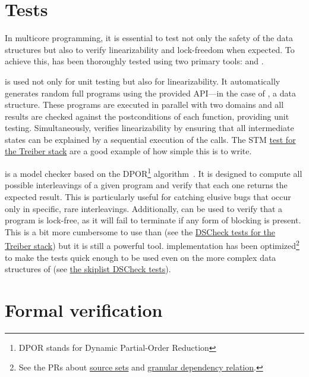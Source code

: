 \documentclass[a4paper, 11pt]{article}
\begin{document}
\section{Tests}

In multicore programming, it is essential to test not only the safety of the data structures but also to verify linearizability and lock-freedom when expected.
To achieve this, \Saturn has been thoroughly tested using two primary tools: \DSCheck and \STM.

\STM is used not only for unit testing but also for linearizability.
It automatically generates random full programs using the provided API---in the case of \Saturn, a data structure.
These programs are executed in parallel with two domains and all results are checked against the postconditions of each function, providing unit testing.
Simultaneously, \STM verifies linearizability by ensuring that all intermediate states can be explained by a sequential execution of the calls. The STM \href{https://github.com/ocaml-multicore/saturn/blob/main/test/treiber_stack/stm_treiber_stack.ml}{test for the Treiber stack} are a good example of how simple this is to write.

\DSCheck is a model checker based on the DPOR\footnote[3]{DPOR stands for Dynamic Partial-Order Reduction} algorithm~\cite{dpor05}.
It is designed to compute all possible interleavings of a given program and verify that each one returns the expected result.
This is particularly useful for catching elusive bugs that occur only in specific, rare interleavings.
Additionally, \DSCheck can be used to verify that a program is lock-free, as it will fail to terminate if any form of blocking is present. This is a bit more cumbersome to use than \STM (see the \href{https://github.com/ocaml-multicore/saturn/blob/main/test/treiber_stack/treiber_stack_dscheck.ml}{DSCheck tests for the Treiber stack}) but it is still a powerful tool. \DSCheck implementation has been optimized\footnote[4]{See the PRs about \href{https://github.com/ocaml-multicore/dscheck/pull/18}{source sets} and \href{https://github.com/ocaml-multicore/dscheck/pull/22}{granular dependency relation}.} to make the tests quick enough to be used even on the more complex data structures of \Saturn (see \href{https://github.com/ocaml-multicore/saturn/blob/main/test/skiplist/stm_skiplist.ml}{the skiplist DSCheck tests}).

\section{Formal verification}
\end{document}
